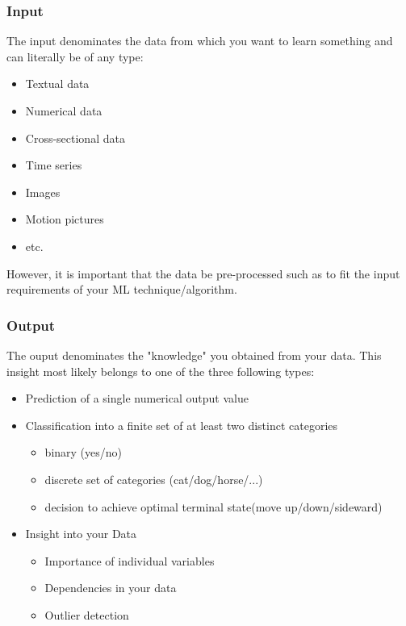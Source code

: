 \documentclass[xcolor=dvipsnames, english, 8pt]{beamer}
\begin{document}
\begin{frame}
    \frametitle{Input}
The input denominates the data from which you want to learn something and can literally be of any type:\vspace{0.25cm}\\
\begin{itemize}
    \item Textual data
    \item Numerical data
    \item Cross-sectional data
    \item Time series
    \item Images
    \item Motion pictures
    \item etc. \vspace{0.25cm}\\
\end{itemize}
However, it is important that the data be {\color{ubRed} pre-processed} such as to fit the input requirements of your ML technique/algorithm.
\end{frame}

\begin{frame}
    \frametitle{Output}
The ouput denominates the "knowledge" you obtained from your data. This insight most likely belongs to one of the three following types:\vspace{0.25cm}\\
\begin{itemize}
    \item {\color{ubRed}Prediction} of a single numerical output value
    \item {\color{ubRed}Classification} into a finite set of at least two distinct categories
    \begin{itemize}
        \item binary (yes/no)
        \item discrete set of categories (cat/dog/horse/...)
        \item decision to achieve optimal terminal state(move up/down/sideward)
    \end{itemize}

    \item {\color{ubRed}Insight} into your Data
    \begin{itemize}
        \item Importance of individual variables
        \item Dependencies in your data
        \item Outlier detection\vspace{0.25cm}\\
    \end{itemize}
\end{itemize}

\end{frame}
\end{document}
